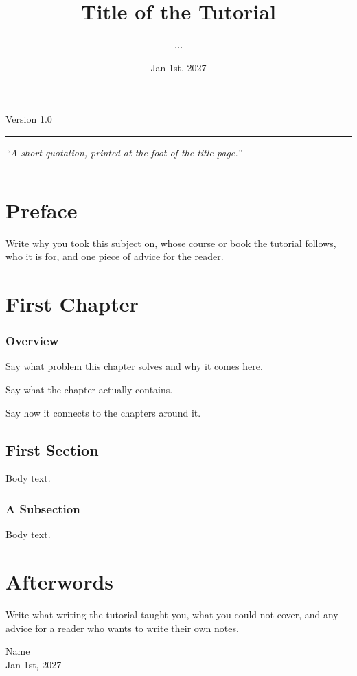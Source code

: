 \documentclass[10pt,a4paper,oneside,numbers=noenddot]{scrbook}
\title{Title of the Tutorial}
\author{...}
\date{Jan 1st, 2027}
\makeatletter
\newcommand*{\bookversion}{1.0}
\newcommand*{\bookquote}{``A short quotation, printed at the foot of the title page.''}
\theoremstyle{ctplain}
\theoremstyle{ctresult}
\renewcommand*{\maketitle}{%
  \begin{titlepage}
    \hypersetup{pageanchor=false}
    \centering
    \null\vspace{5em}
    {\Huge\bfseries \@title\par}
    \vspace{1.5em}
    {\large Version \bookversion\par}
    \vspace{3em}
    \rule{\textwidth}{0.4pt}\par
    \vspace{1.2em}
    {\itshape \bookquote\par}
    \vspace{1.2em}
    \rule{\textwidth}{0.4pt}\par
    \vfill
    {\large \@author\par}
    \vspace{0.6em}
    {\large \@date\par}
    \vspace{2em}
  \end{titlepage}
}
\makeatother
\begin{document}
\maketitle

\frontmatter
\tableofcontents

\chapter*{Preface}
\linespread{1.55}\selectfont

Write why you took this subject on, whose course or book the tutorial follows, who it is for, and one piece of advice for the reader.



\linespread{1.2}\selectfont

\mainmatter

\chapter{First Chapter}

\subsection*{Overview}

Say what problem this chapter solves and why it comes here.

Say what the chapter actually contains.

Say how it connects to the chapters around it.

\section{First Section}

Body text.

\subsection{A Subsection}

Body text.

\chapter*{Afterwords}

\linespread{1.55}\selectfont

Write what writing the tutorial taught you, what you could not cover, and any advice for a reader who wants to write their own notes.

\begin{flushright}
  Name\\
  Jan 1st, 2027
\end{flushright}
\end{document}
